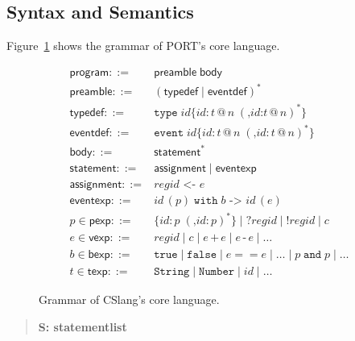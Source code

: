 \subsection{Syntax and Semantics}
\label{sub:SyntaxAndSemantics}

Figure~\ref{lst:SyntaxGrammar} shows the grammar of PORT's core language.

\begin{figure}[t]
\centering
\begin{align*}
\mathsf{program} ::= {} & \mathsf{preamble} \; \mathsf{body}\\
\mathsf{preamble} ::= {} & (\mathsf{typedef} \mid \mathsf{eventdef})^*\\
\mathsf{typedef} ::= {} & \mathtt{type}\; \mathit{id} \texttt{\{}\mathit{id} \texttt{:}\, t\, \texttt{@}\, n \; (\texttt{,} \mathit{id}\texttt{:} t\,\texttt{@}\,n)^*\texttt{\}}\\
\mathsf{eventdef} ::= {} & \mathtt{event}\; \mathit{id} \texttt{\{}\mathit{id}\texttt{:}\, t\,\texttt{@}\,n \; (\texttt{,} \mathit{id}\texttt{:}\, t\,\texttt{@}\,n)^*\texttt{\}}\\
\mathsf{body} ::= {} & \mathsf{statement}^*\\
\mathsf{statement} ::= {} & \mathsf{assignment} \mid \mathsf{eventexp}\\
\mathsf{assignment} ::= {} & \mathit{regid} \texttt{ <- } e\\
\mathsf{eventexp} ::= {} & \mathit{id}\,(p) \;\mathtt{with}\; b \texttt{ -> } \mathit{id}\,(e)\\
p \in \mathsf{pexp} ::= {} & \texttt{\{} \mathit{id}\texttt{:}\, p \; (\texttt{,} \mathit{id}\texttt{:}\, p)^*\texttt{\}} \mid \texttt{?} \mathit{regid} \mid \texttt{!} \mathit{regid} \mid c \\
e \in \mathsf{vexp} ::= {} & \mathit{regid} \mid c \mid e \,\texttt{+}\, e \mid e \,\texttt{-}\, e \mid \dots\\
b \in \mathsf{bexp} ::= {} & \mathtt{true} \mid \mathtt{false} \mid e == e \mid \dots \mid p \;\mathtt{and}\; p \mid \dots\\
t \in \mathsf{texp} ::= {} & \mathtt{String} \mid \mathtt{Number} \mid \mathit{id} \mid \dots
\end{align*}
\caption{Grammar of CSlang's core language.}
\label{lst:SyntaxGrammar}
\end{figure}


\begin{quote}
\centering
\textbf{S: statementlist}
\end{quote}

